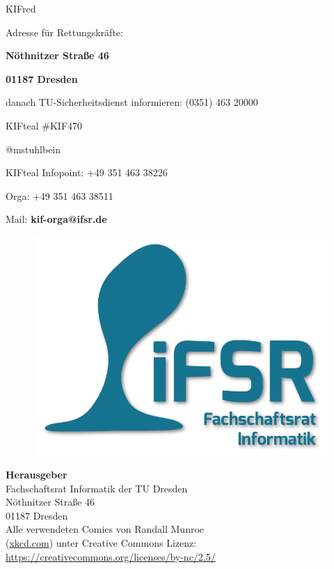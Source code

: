 \begin{awesomeblock}[KIFred]{2pt}{\faFire}{KIFred}
    \begin{minipage}[t]{.82\textwidth}
        Adresse für Rettungskräfte:

        \begin{center}
            \textbf{Nöthnitzer Straße 46}

            \textbf{01187 Dresden}
        \end{center}

        danach TU-Sicherheitsdienst informieren:
        (0351) 463 20000
    \end{minipage}
\end{awesomeblock}

\begin{awesomeblock}[KIFteal]{2pt}{\faTwitter}{KIFteal}
  \#KIF470

  @mstuhlbein
\end{awesomeblock}

\begin{awesomeblock}[KIFteal]{2pt}{\faInfoCircle}{KIFteal}
  Infopoint: +49 351 463 38226

  Orga: +49 351 463 38511

  Mail: \textbf{kif-orga@ifsr.de}
\end{awesomeblock}

\vfill

\setlength{\parindent}{0cm}

\begin{figure}
  \vspace*{-20pt}
  \includegraphics[width=.4\textwidth]{img/imprint}
\end{figure}

\footnotesize
\textbf{Herausgeber} \\
Fachschaftsrat Informatik der TU Dresden\\
Nöthnitzer Straße 46\\
01187 Dresden\\[1\baselineskip]

Alle verwendeten Comics von Randall Munroe\\ (\url{xkcd.com}) unter Creative Commons Lizenz:\\
\url{https://creativecommons.org/licenses/by-nc/2.5/}\\[1\baselineskip]

